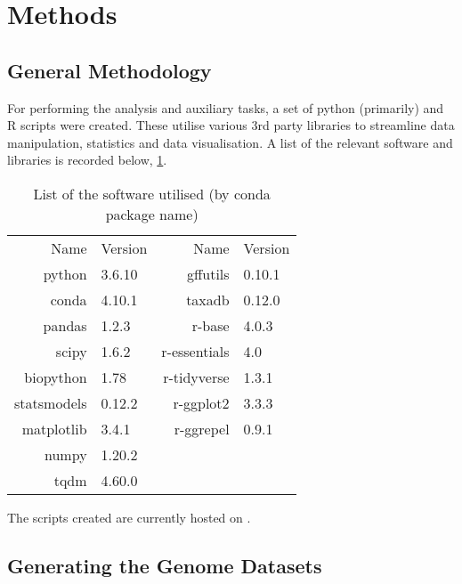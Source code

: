 \documentclass[../main.tex]{subfile}
\begin{document}
 \section{Methods}
    \subsection{General Methodology}
        For performing the analysis and auxiliary tasks, a set of python (primarily) and R scripts were created. These utilise various 3rd party libraries to streamline data manipulation, statistics and data visualisation. A list of the relevant software and libraries is recorded below, \cref{table:method/software}.

        \begin{table}[H]
            \centering
            \caption{List of the software utilised (by conda package name)}
            \begin{tabular}{@{} *{2}{r l}}
                \toprule
                Name           & Version & Name           & Version \\
                \cmidrule{1-2}             \cmidrule(l){3-4}
                python         & 3.6.10  & gffutils       & 0.10.1  \\
                conda          & 4.10.1  & taxadb         & 0.12.0  \\
                pandas         & 1.2.3   & r-base         & 4.0.3   \\
                scipy          & 1.6.2   & r-essentials   & 4.0     \\
                biopython      & 1.78    & r-tidyverse    & 1.3.1   \\
                statsmodels    & 0.12.2  & r-ggplot2      & 3.3.3   \\
                matplotlib     & 3.4.1   & r-ggrepel      & 0.9.1   \\
                numpy          & 1.20.2  & & \\
                tqdm           & 4.60.0  & & \\
                \bottomrule
            \end{tabular}
            \label{table:method/software}
        \end{table}

        The scripts created are currently hosted on \href{Github}{\color{blue}{https://git.io/JO5wD}}.

    \subsection{Generating the Genome Datasets}
\end{document}
